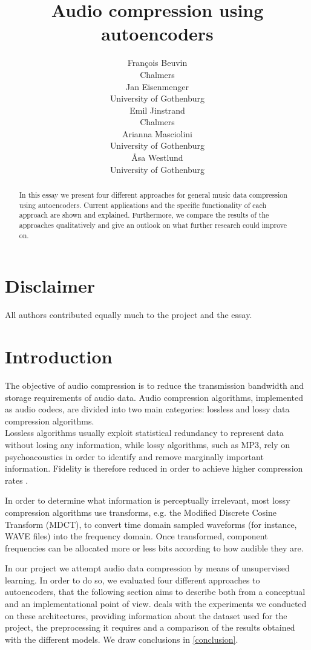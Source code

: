 \documentclass[11pt]{article}
\title{Audio compression using autoencoders}
\author{Fran\c{c}ois Beuvin \\
  Chalmers \\
  \And
  Jan Eisenmenger \\
  University of Gothenburg \\
  \And
  Emil Jinstrand \\
  Chalmers \\
  \AND
  Arianna Masciolini \\
  University of Gothenburg\\
  \And
  \r{A}sa Westlund \\
  University of Gothenburg\\}
\date{}
\begin{document}
\maketitle

\begin{abstract}
In this essay we present four different approaches for general music data compression using autoencoders. Current applications and the specific functionality of each approach are shown and explained. Furthermore, we compare the results of the approaches qualitatively and give an outlook on what further research could improve on.
\end{abstract}

\section*{Disclaimer}
All authors contributed equally much to the project and the essay. \\

\section{Introduction}
The objective of audio compression is to reduce the transmission bandwidth and storage requirements of audio data. Audio compression algorithms, implemented as audio codecs, are divided into two main categories: lossless and lossy data compression algorithms.\\ 
Lossless algorithms usually exploit statistical redundancy to represent data without losing any information, while lossy algorithms, such as MP3, rely on psychoacoustics in order to identify and remove marginally important information. Fidelity is therefore reduced in order to achieve higher compression rates \cite{Mahdi.2012}.\par
In order to determine what information is perceptually irrelevant, most lossy compression algorithms use transforms, e.g. the Modified Discrete Cosine Transform (MDCT), to convert time domain sampled waveforms (for instance, WAVE files) into the frequency domain. Once transformed, component frequencies can be allocated more or less bits according to how audible they are. \par
In our project we attempt audio data compression by means of unsupervised learning. In order to do so, we evaluated four different approaches to autoencoders, that the following section aims to describe both from a conceptual and an implementational point of view.  deals with the experiments we conducted on these architectures, providing information about the dataset used for the project, the preprocessing it requires and a comparison of the results obtained with the different models. We draw conclusions in \autoref{conclusion}.
\end{document}
